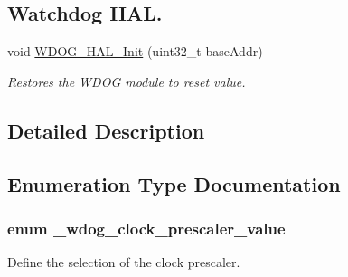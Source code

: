 \subsection*{Watchdog H\+AL.}
\begin{DoxyCompactItemize}
\item 
void \hyperlink{group__wdog__hal_ga80c766e7e9ba83f7f968f5c4e2370b19}{W\+D\+O\+G\+\_\+\+H\+A\+L\+\_\+\+Init} (uint32\+\_\+t base\+Addr)
\begin{DoxyCompactList}\small\item\em Restores the W\+D\+OG module to reset value. \end{DoxyCompactList}\end{DoxyCompactItemize}


\subsection{Detailed Description}


\subsection{Enumeration Type Documentation}
\subsubsection[{\texorpdfstring{\+\_\+wdog\+\_\+clock\+\_\+prescaler\+\_\+value}{_wdog_clock_prescaler_value}}]{\setlength{\rightskip}{0pt plus 5cm}enum {\bf \+\_\+wdog\+\_\+clock\+\_\+prescaler\+\_\+value}}\hypertarget{group__wdog__hal_ga21b132de3ebfea46c098feb9a0ee742d}{}\label{group__wdog__hal_ga21b132de3ebfea46c098feb9a0ee742d}


Define the selection of the clock prescaler. 


